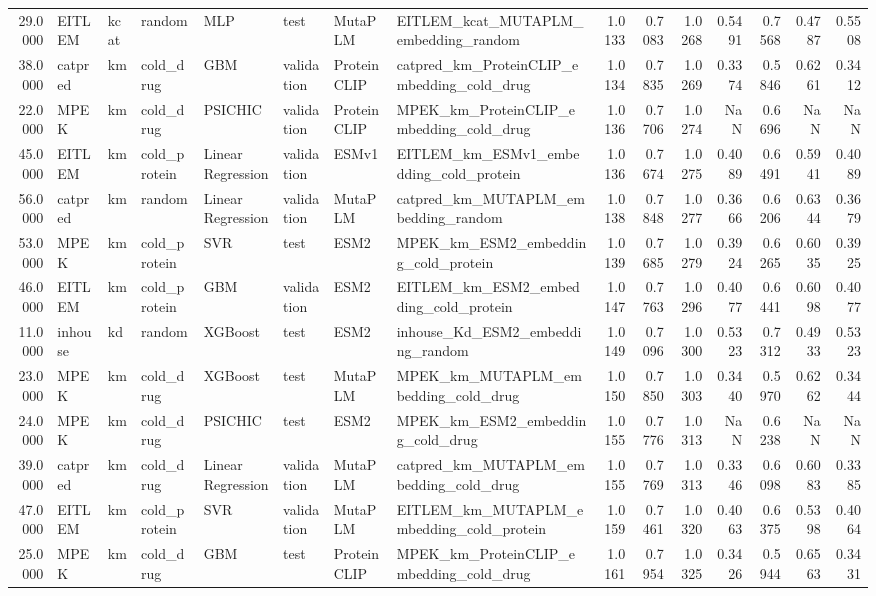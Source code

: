 \begin{tabular}{rlllllllrrrrrrr}
29.0000 & EITLEM & kcat & random & MLP & test & MutaPLM & EITLEM_kcat_MUTAPLM_embedding_random & 1.0133 & 0.7083 & 1.0268 & 0.5491 & 0.7568 & 0.4787 & 0.5508 \\
38.0000 & catpred & km & cold_drug & GBM & validation & ProteinCLIP & catpred_km_ProteinCLIP_embedding_cold_drug & 1.0134 & 0.7835 & 1.0269 & 0.3374 & 0.5846 & 0.6261 & 0.3412 \\
22.0000 & MPEK & km & cold_drug & PSICHIC & validation & ProteinCLIP & MPEK_km_ProteinCLIP_embedding_cold_drug & 1.0136 & 0.7706 & 1.0274 & NaN & 0.6696 & NaN & NaN \\
45.0000 & EITLEM & km & cold_protein & Linear Regression & validation & ESMv1 & EITLEM_km_ESMv1_embedding_cold_protein & 1.0136 & 0.7674 & 1.0275 & 0.4089 & 0.6491 & 0.5941 & 0.4089 \\
56.0000 & catpred & km & random & Linear Regression & validation & MutaPLM & catpred_km_MUTAPLM_embedding_random & 1.0138 & 0.7848 & 1.0277 & 0.3666 & 0.6206 & 0.6344 & 0.3679 \\
53.0000 & MPEK & km & cold_protein & SVR & test & ESM2 & MPEK_km_ESM2_embedding_cold_protein & 1.0139 & 0.7685 & 1.0279 & 0.3924 & 0.6265 & 0.6035 & 0.3925 \\
46.0000 & EITLEM & km & cold_protein & GBM & validation & ESM2 & EITLEM_km_ESM2_embedding_cold_protein & 1.0147 & 0.7763 & 1.0296 & 0.4077 & 0.6441 & 0.6098 & 0.4077 \\
11.0000 & inhouse & kd & random & XGBoost & test & ESM2 & inhouse_Kd_ESM2_embedding_random & 1.0149 & 0.7096 & 1.0300 & 0.5323 & 0.7312 & 0.4933 & 0.5323 \\
23.0000 & MPEK & km & cold_drug & XGBoost & test & MutaPLM & MPEK_km_MUTAPLM_embedding_cold_drug & 1.0150 & 0.7850 & 1.0303 & 0.3440 & 0.5970 & 0.6262 & 0.3444 \\
24.0000 & MPEK & km & cold_drug & PSICHIC & test & ESM2 & MPEK_km_ESM2_embedding_cold_drug & 1.0155 & 0.7776 & 1.0313 & NaN & 0.6238 & NaN & NaN \\
39.0000 & catpred & km & cold_drug & Linear Regression & validation & MutaPLM & catpred_km_MUTAPLM_embedding_cold_drug & 1.0155 & 0.7769 & 1.0313 & 0.3346 & 0.6098 & 0.6083 & 0.3385 \\
47.0000 & EITLEM & km & cold_protein & SVR & validation & MutaPLM & EITLEM_km_MUTAPLM_embedding_cold_protein & 1.0159 & 0.7461 & 1.0320 & 0.4063 & 0.6375 & 0.5398 & 0.4064 \\
25.0000 & MPEK & km & cold_drug & GBM & test & ProteinCLIP & MPEK_km_ProteinCLIP_embedding_cold_drug & 1.0161 & 0.7954 & 1.0325 & 0.3426 & 0.5944 & 0.6563 & 0.3431 \\

\end{tabular}
